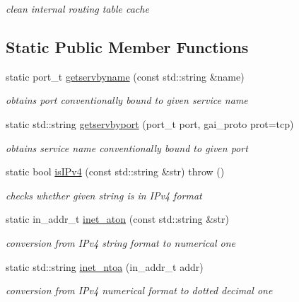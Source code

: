 \begin{CompactItemize}
\begin{CompactList}\small\item\em clean internal routing table cache \item\end{CompactList}\end{CompactItemize}
\subsection*{Static Public Member Functions}
\begin{CompactItemize}
\item 
static port\_\-t \hyperlink{classsocketpp_1_1AddrHandler_aa24239225e2a35cce9322dfa68bf438}{getservbyname} (const std::string \&name)
\begin{CompactList}\small\item\em obtains port conventionally bound to given service name \item\end{CompactList}\item 
static std::string \hyperlink{classsocketpp_1_1AddrHandler_c099c4bdf0b45e5d4a1e5806d896768e}{getservbyport} (port\_\-t port, gai\_\-proto prot=tcp)
\begin{CompactList}\small\item\em obtains service name conventionally bound to given port \item\end{CompactList}\item 
static bool \hyperlink{classsocketpp_1_1AddrHandler_652e24c273f7905cebf8d04b3cfef74d}{isIPv4} (const std::string \&str)  throw ()
\begin{CompactList}\small\item\em checks whether given string is in IPv4 format \item\end{CompactList}\item 
static in\_\-addr\_\-t \hyperlink{classsocketpp_1_1AddrHandler_e2eda37cd4c20059c557e4e65c829cf8}{inet\_\-aton} (const std::string \&str)
\begin{CompactList}\small\item\em conversion from IPv4 string format to numerical one \item\end{CompactList}\item 
static std::string \hyperlink{classsocketpp_1_1AddrHandler_a4377d84c8ea976aeada2b2eb0ac248d}{inet\_\-ntoa} (in\_\-addr\_\-t addr)
\begin{CompactList}\small\item\em conversion from IPv4 numerical format to dotted decimal one \item\end{CompactList}\end{CompactItemize}


